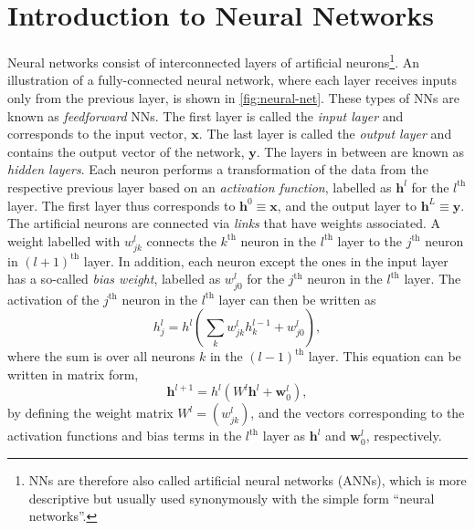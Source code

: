 \section{Introduction to Neural Networks}
Neural networks consist of interconnected layers of artificial neurons\footnote{ NNs are therefore also called artificial neural networks (ANNs), which is more descriptive but usually used synonymously with the simple form ``neural networks''.}. An illustration of a fully-connected neural network, where each layer receives inputs only from the previous layer, is shown in \cref{fig:neural-net}. These types of NNs are known as \emph{feedforward} NNs.
The first layer is called the \emph{input layer} and corresponds to the input vector, $\mathbf{x}$. The last layer is called the \emph{output layer} and contains the output vector of the network, $\mathbf{y}$. The layers in between are known as \emph{hidden layers}. Each neuron performs a transformation of the data from the respective previous layer based on an \emph{activation function}, labelled as $\mathbf{h}^l$ for the $l^\text{th}$ layer.
The first layer thus corresponds to $\mathbf{h}^0 \equiv \mathbf{x}$, and the output layer to $\mathbf{h}^L \equiv \mathbf{y}$.
The artificial neurons are connected via \emph{links} that have weights associated.
A weight labelled with $w^{l}_{jk}$ connects the $k^\text{th}$ neuron in the $l^\text{th}$ layer to the $j^\text{th}$ neuron in $(l+1)^\text{th}$ layer.
In addition, each neuron except the ones in the input layer has a so-called \emph{bias weight}, labelled as $w^{l}_{j0}$ for the $j^\text{th}$ neuron in the $l^\text{th}$ layer.
The activation of the $j^\text{th}$ neuron in the $l^{\text{th}}$ layer can then be written as
\begin{equation}
    h^{l}_j =  h^{l} \left( \sum_{k}   w^{l}_{jk} h^{l-1}_{k}  + w^{l}_{j0} \right),
\end{equation}
where the sum is over all neurons $k$ in the $(l-1)^\text{th}$ layer.
This equation can be written in matrix form,
\begin{equation}
    \mathbf{h}^{l+1} =  h^{l} \left( W^{l} \mathbf{h}^{l}  + \mathbf{w}^{l}_{0} \right),
\end{equation}
by defining the weight matrix $W^l = \left(w^l_{jk} \right)$, and the vectors corresponding to the activation functions and bias terms in the $l^\text{th}$ layer as $\mathbf{h}^l$ and  $\mathbf{w}^{l}_0$, respectively.
